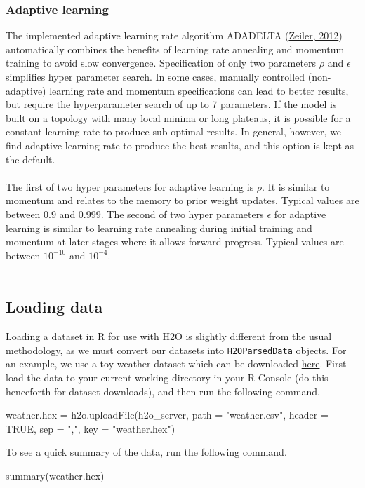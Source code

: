 \documentclass[11pt]{article}
\begin{document}
\subsubsection{Adaptive learning} \label{2.4.3}
The implemented adaptive learning rate algorithm ADADELTA (\href{http://arxiv.org/pdf/1212.5701v1.pdf}{Zeiler, 2012})  automatically combines the benefits of learning rate annealing and momentum training to avoid slow convergence. Specification of only two parameters $\rho$ and $\epsilon$  simplifies hyper parameter search. In some cases, manually controlled (non-adaptive) learning rate and momentum specifications can lead to better results, but require the hyperparameter search of up to 7 parameters. If the model is built on a topology with many local minima or long plateaus, it is possible for a constant learning rate to produce sub-optimal results. In general, however, we find adaptive learning rate to produce the best results, and this option is kept as the default. 
\\
\\
The first of two hyper parameters for adaptive learning is $\rho$. It is similar to momentum and relates to the memory to prior weight updates. Typical values are between 0.9 and 0.999. The second of two hyper parameters $\epsilon$ for adaptive learning is similar to learning rate annealing during initial training and momentum at later stages where it allows forward progress.
Typical values are between $10^{-10}$ and $10^{-4}$.
\\
\\
\subsection{Loading data} \label{2.5}

Loading a dataset in R for use with H2O is slightly different from the usual methodology, as we must convert our datasets into \texttt{H2OParsedData} objects. For an example, we use a toy weather dataset which can be downloaded \href{https://raw.githubusercontent.com/0xdata/h2o/master/smalldata/weather.csv}{here}. First load the data to your current working directory in your R Console (do this henceforth for dataset downloads), and then run the following command.
\begin{spverbatim}
weather.hex = h2o.uploadFile(h2o_server, path = "weather.csv", header = TRUE, sep = ",", key = "weather.hex")
\end{spverbatim}
\bigskip
\noindent
To see a quick summary of the data, run the following command.
\begin{spverbatim}
summary(weather.hex)
\end{spverbatim}
\end{document}
